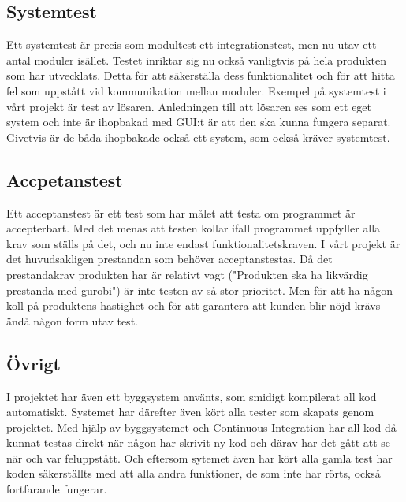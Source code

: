 \subsection{Systemtest}	
	Ett systemtest är precis som modultest ett integrationstest, men nu utav ett antal moduler isället. Testet inriktar sig nu också vanligtvis på hela produkten som har utvecklats. Detta för att säkerställa dess funktionalitet och för att hitta fel som uppstått vid kommunikation mellan moduler. Exempel på systemtest i vårt projekt är test av lösaren. Anledningen till att lösaren ses som ett eget system och inte är ihopbakad med GUI:t är att den ska kunna fungera separat. Givetvis är de båda ihopbakade också ett system, som också kräver systemtest.	
\subsection{Accpetanstest}	
	Ett acceptanstest är ett test som har målet att testa om programmet är accepterbart. Med det menas att testen kollar ifall programmet uppfyller alla krav som ställs på det, och nu inte endast funktionalitetskraven. I vårt projekt är det huvudsakligen prestandan som behöver acceptanstestas. Då det prestandakrav produkten har är relativt vagt ("Produkten ska ha likvärdig prestanda med gurobi") är inte testen av så stor prioritet. Men för att ha någon koll på produktens hastighet och för att garantera att kunden blir nöjd krävs ändå någon form utav test.
\subsection{Övrigt}	
	I projektet har även ett byggsystem använts, som smidigt kompilerat all kod automatiskt. Systemet har därefter även kört alla tester som skapats genom projektet.
	Med hjälp av byggsystemet och Continuous Integration har all kod då kunnat testas direkt när någon har skrivit ny kod och därav har det gått att se när och var feluppstått. Och eftersom sytemet även har kört alla gamla test har koden säkerställts med att alla andra funktioner, de som inte har rörts, också fortfarande fungerar.